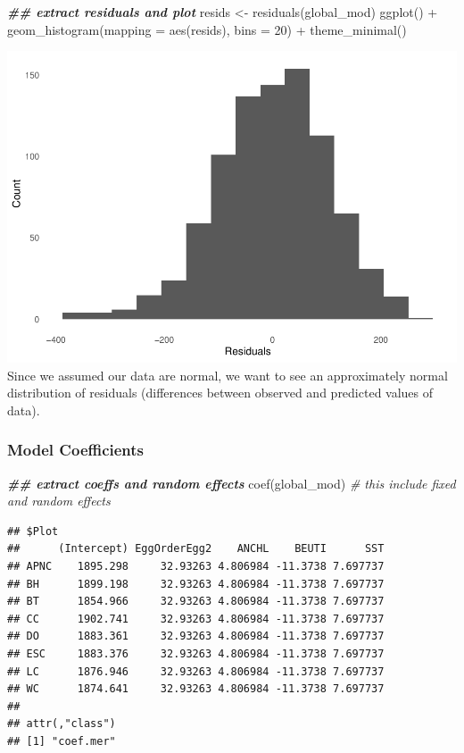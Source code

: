 \documentclass[
]{article}
\newenvironment{Shaded}{\begin{snugshade}}{\end{snugshade}}
\newcommand{\AttributeTok}[1]{\textcolor[rgb]{0.77,0.63,0.00}{#1}}
\newcommand{\CommentTok}[1]{\textcolor[rgb]{0.56,0.35,0.01}{\textit{#1}}}
\newcommand{\DecValTok}[1]{\textcolor[rgb]{0.00,0.00,0.81}{#1}}
\newcommand{\DocumentationTok}[1]{\textcolor[rgb]{0.56,0.35,0.01}{\textbf{\textit{#1}}}}
\newcommand{\FunctionTok}[1]{\textcolor[rgb]{0.00,0.00,0.00}{#1}}
\newcommand{\NormalTok}[1]{#1}
\newcommand{\OtherTok}[1]{\textcolor[rgb]{0.56,0.35,0.01}{#1}}
\newcommand{\SpecialCharTok}[1]{\textcolor[rgb]{0.00,0.00,0.00}{#1}}
\begin{document}
\begin{Shaded}
\begin{Highlighting}[]
\DocumentationTok{\#\# extract residuals and plot}
\NormalTok{resids }\OtherTok{\textless{}{-}} \FunctionTok{residuals}\NormalTok{(global\_mod)}
\FunctionTok{ggplot}\NormalTok{() }\SpecialCharTok{+} 
  \FunctionTok{geom\_histogram}\NormalTok{(}\AttributeTok{mapping =} \FunctionTok{aes}\NormalTok{(resids), }\AttributeTok{bins =} \DecValTok{20}\NormalTok{) }\SpecialCharTok{+} 
  \FunctionTok{theme\_minimal}\NormalTok{()}
\end{Highlighting}
\end{Shaded}

\includegraphics{SCMU_egg_model_files/figure-latex/d2-1.pdf} Since we
assumed our data are normal, we want to see an approximately normal
distribution of residuals (differences between observed and predicted
values of data).

\hypertarget{model-coefficients}{%
\subsubsection{Model Coefficients}\label{model-coefficients}}

\begin{Shaded}
\begin{Highlighting}[]
\DocumentationTok{\#\# extract coeffs and random effects}
\FunctionTok{coef}\NormalTok{(global\_mod) }\CommentTok{\# this include fixed and random effects}
\end{Highlighting}
\end{Shaded}

\begin{verbatim}
## $Plot
##      (Intercept) EggOrderEgg2    ANCHL    BEUTI      SST
## APNC    1895.298     32.93263 4.806984 -11.3738 7.697737
## BH      1899.198     32.93263 4.806984 -11.3738 7.697737
## BT      1854.966     32.93263 4.806984 -11.3738 7.697737
## CC      1902.741     32.93263 4.806984 -11.3738 7.697737
## DO      1883.361     32.93263 4.806984 -11.3738 7.697737
## ESC     1883.376     32.93263 4.806984 -11.3738 7.697737
## LC      1876.946     32.93263 4.806984 -11.3738 7.697737
## WC      1874.641     32.93263 4.806984 -11.3738 7.697737
## 
## attr(,"class")
## [1] "coef.mer"
\end{verbatim}
\end{document}
